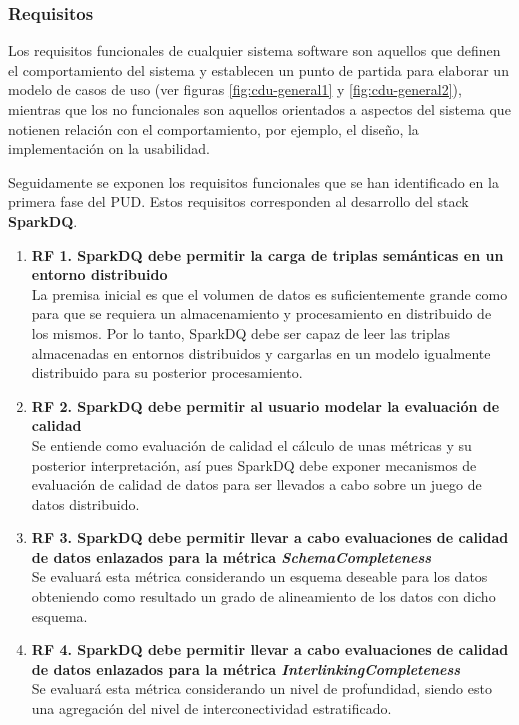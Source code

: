 

\subsubsection{Requisitos}

Los requisitos funcionales de cualquier sistema software son aquellos que definen el comportamiento del
sistema y establecen un punto de partida para elaborar un modelo de casos de
uso (ver figuras \ref{fig:cdu-general1} y  \ref{fig:cdu-general2}), mientras que los no funcionales son aquellos orientados a aspectos del
sistema que notienen relación con el comportamiento, por ejemplo, el diseño, la
implementación on la usabilidad. 

Seguidamente se exponen los requisitos funcionales que se han identificado en la
primera fase del \acs{PUD}. Estos requisitos corresponden al desarrollo del
stack \textbf{SparkDQ}.

\begin{enumerate}
\item \textbf{RF 1. SparkDQ debe permitir la carga de triplas semánticas en un entorno
  distribuido} \\La premisa inicial es que el volumen de datos es
  suficientemente grande como para que se requiera un almacenamiento y
  procesamiento en distribuido de los mismos. Por lo tanto, SparkDQ debe ser
  capaz de leer las triplas almacenadas en entornos distribuidos y cargarlas en
  un modelo igualmente distribuido para su posterior procesamiento.
  
\item \textbf{RF 2. SparkDQ debe permitir al usuario modelar la evaluación de
  calidad}\\Se entiende como evaluación de calidad el cálculo de unas métricas y
  su posterior interpretación, así pues SparkDQ debe exponer mecanismos de
  evaluación de calidad de datos para ser llevados a cabo sobre un juego de
  datos distribuido. 
\item \textbf{RF 3. SparkDQ debe permitir llevar a cabo evaluaciones de calidad de
  datos enlazados para la métrica \textit{SchemaCompleteness}}\\Se evaluará esta
  métrica considerando un esquema deseable para los datos obteniendo como
  resultado un grado de alineamiento de los datos con dicho esquema. 

\item \textbf{RF 4. SparkDQ debe permitir llevar a cabo evaluaciones de calidad de
  datos enlazados para la métrica \textit{InterlinkingCompleteness}}\\Se
  evaluará esta métrica considerando un nivel de profundidad, siendo esto una
  agregación del nivel de interconectividad estratificado. 
\end{enumerate}

